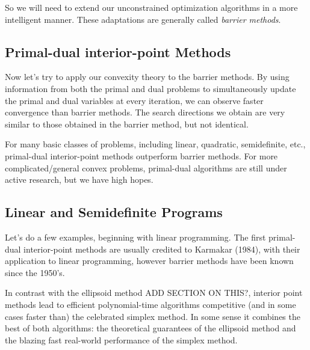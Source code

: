 \documentclass[11pt]{article}
\numberwithin{equation}{section}
\theoremstyle{definition}
\begin{document}
So we will need to extend our unconstrained optimization algorithms in a more intelligent manner. These adaptations are generally called \textit{barrier methods}.
\subsection{Primal-dual interior-point Methods}
Now let's try to apply our convexity theory to the barrier methods. By using information from both the primal and dual problems to simultaneously update the primal and dual variables at every iteration, we can observe faster convergence than barrier methods. The search directions we obtain are very similar to those obtained in the barrier method, but not identical.

For many basic classes of problems, including linear, quadratic, semidefinite, etc., primal-dual interior-point methods outperform barrier methods. For more complicated/general convex problems, primal-dual algorithms are still under active research, but we have high hopes.
\subsection{Linear and Semidefinite Programs}
Let's do a few examples, beginning with linear programming. The first primal-dual interior-point methods are usually credited to Karmakar (1984), with their application to linear programming, however barrier methods have been known since the 1950's. 

In contrast with the ellipsoid method ADD SECTION ON THIS?, interior point methods lead to efficient polynomial-time algorithms competitive (and in some cases faster than) the celebrated simplex method. In some sense it combines the best of both algorithms: the theoretical guarantees of the ellipsoid method and the blazing fast real-world performance of the simplex method.
\end{document}
